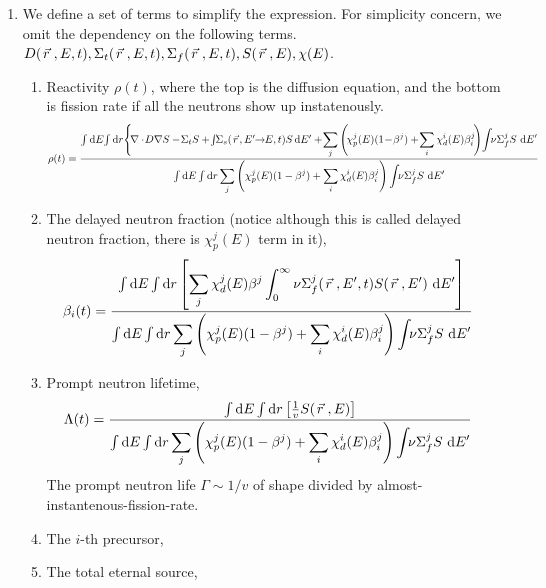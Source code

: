 \documentclass{school-22.211-notes}
\begin{document}
\begin{enumerate}
\item We define a set of terms to simplify the expression. For simplicity concern, we omit the dependency on the following terms. $D(\left.\vec{r}\right., E, t), \Sigma_t (\left.\vec{r}\right., E, t), \Sigma_f(\left.\vec{r}\right., E, t),  S(\left.\vec{r}\right., E), \chi(E)$. 
\begin{enumerate}
\item Reactivity $\rho(t)$, where the top is the diffusion equation, and the bottom is fission rate if all the neutrons show up instatenously. 
\scriptsize
\begin{align}
\rho (t) &= \frac{\int \bsp \dE \! \int \bsp \dr \Bigg\{ \!\divergence \! D  \gradient S  - \! \Sigma_t S  + \! \int \bsp \Sigma_s (\vecr \!, E' \bsp \to \bsp E, t) S \! \dE'   
    + \! \Sum_j \left( \! \chi_p^j (E) (1 \! - \! \beta^j) +  \! \Sum_i \chi_d^i (E) \beta_i^j \! \right) \! \int \bsp \nu \Sigma_f^j  S \dE'  }{\int \bsp \dE \int \bsp \dr \Sum_j \left( \chi_p^j (E) (1-\beta^j) + \Sum_i \chi_d^i (E) \beta_i^j \right) \int \bsp \nu \Sigma_f^j S \dE'} 
\end{align}
\normalsize
{}


\item The delayed neutron fraction (notice although this is called delayed neutron fraction, there is $\chi_p^j(E)$ term in it), 
\begin{align}
\beta_i (t) &= \frac{\int \bsp \dE \int \bsp \dr \left[ \Sum_j \chi_d^j (E) \beta^j \int_0^{\infty} \nu \Sigma_f^j (\vecr, E', t) S(\vecr, E') \dE' \right] }{\int \bsp \dE \int \bsp \dr \Sum_j \left( \chi_p^j (E) (1-\beta^j) + \Sum_i \chi_d^i (E) \beta_i^j \right) \int \bsp \nu \Sigma_f^j S \dE'} 
\end{align}

\item Prompt neutron lifetime, 
\begin{align}
\Lambda (t) &= \frac{\int \bsp \dE \int \bsp  \dr \left[ \frac{1}{v} S(\vecr, E) \right] }{\int \bsp \dE \int \bsp \dr \Sum_j \left( \chi_p^j (E) (1-\beta^j) + \Sum_i \chi_d^i (E) \beta_i^j \right) \int \bsp \nu \Sigma_f^j S \dE'} 
\end{align}
The prompt neutron life $\Gamma \sim 1/v$ of shape divided by almost-instantenous-fission-rate. 
\item The $i$-th precursor, 
\item The total eternal source, 
\end{enumerate}


\end{enumerate}
\end{document}
